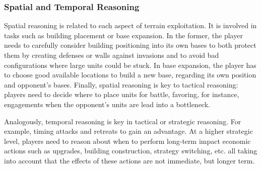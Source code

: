 \documentclass{llncs}
\begin{document}
\subsubsection*{Spatial and Temporal Reasoning}
Spatial reasoning is  related to each aspect  of terrain exploitation.
It  is  involved   in  tasks  such  as  building   placement  or  base
expansion.  In the  former,  the player  needs  to carefully  consider
building  positioning into  its  own  bases to  both  protect them  by
creating  defenses or walls  against invasions  and to  avoid bad  configurations
where large units could be stuck. In base expansion, the player has to
choose good available locations to build a new base, regarding its own
position and  opponent's bases. Finally,  spatial reasoning is  key to
tactical reasoning:  players need to  decide where to place  units for
battle, favoring, for instance,  engagements when the opponent's units
are lead into a bottleneck.



Analogously,  temporal  reasoning  is  key in  tactical  or  strategic
reasoning.  For  example,  timing  attacks and  retreats  to  gain  an
advantage. At a  higher strategic level, players need  to reason about
when to  perform long-term impact  economic actions such  as upgrades,
building  construction,  strategy  switching,  etc.  all  taking  into
account  that the  effects of  these  actions are  not immediate,  but
longer term.
\end{document}
